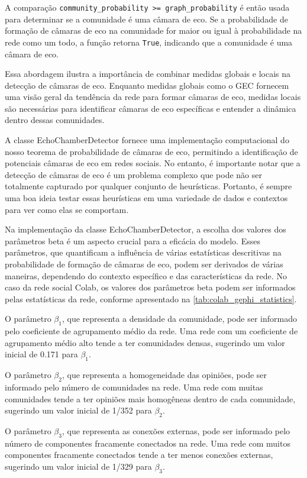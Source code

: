 A comparação \texttt{community\_probability >= graph\_probability} é então usada para determinar se a comunidade é uma câmara de eco. Se a probabilidade de formação de câmaras de eco na comunidade for maior ou igual à probabilidade na rede como um todo, a função retorna \texttt{True}, indicando que a comunidade é uma câmara de eco.

Essa abordagem ilustra a importância de combinar medidas globais e locais na detecção de câmaras de eco. Enquanto medidas globais como o GEC fornecem uma visão geral da tendência da rede para formar câmaras de eco, medidas locais são necessárias para identificar câmaras de eco específicas e entender a dinâmica dentro dessas comunidades.

A classe EchoChamberDetector fornece uma implementação computacional do nosso teorema de probabilidade de câmaras de eco, permitindo a identificação de potenciais câmaras de eco em redes sociais. No entanto, é importante notar que a detecção de câmaras de eco é um problema complexo que pode não ser totalmente capturado por qualquer conjunto de heurísticas. Portanto, é sempre uma boa ideia testar essas heurísticas em uma variedade de dados e contextos para ver como elas se comportam.

Na implementação da classe EchoChamberDetector, a escolha dos valores dos parâmetros beta é um aspecto crucial para a eficácia do modelo. Esses parâmetros, que quantificam a influência de várias estatísticas descritivas na probabilidade de formação de câmaras de eco, podem ser derivados de várias maneiras, dependendo do contexto específico e das características da rede. No caso da rede social Colab, os valores dos parâmetros beta podem ser informados pelas estatísticas da rede, conforme apresentado na \autoref{tab:colab_gephi_statistics}.

O parâmetro $\beta_1$, que representa a densidade da comunidade, pode ser informado pelo coeficiente de agrupamento médio da rede. Uma rede com um coeficiente de agrupamento médio alto tende a ter comunidades densas, sugerindo um valor inicial de 0.171 para $\beta_1$.

O parâmetro $\beta_2$, que representa a homogeneidade das opiniões, pode ser informado pelo número de comunidades na rede. Uma rede com muitas comunidades tende a ter opiniões mais homogêneas dentro de cada comunidade, sugerindo um valor inicial de 1/352 para $\beta_2$.

O parâmetro $\beta_3$, que representa as conexões externas, pode ser informado pelo número de componentes fracamente conectados na rede. Uma rede com muitos componentes fracamente conectados tende a ter menos conexões externas, sugerindo um valor inicial de 1/329 para $\beta_3$.

